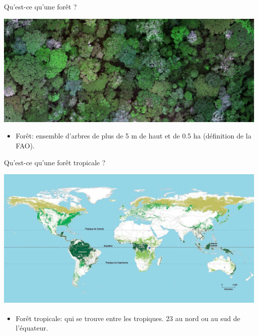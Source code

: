 \documentclass[10pt,table,dvipsnames,compress]{beamer}
\begin{document}
\begin{frame}[label={sec:org6c367b3}]{Qu'est-ce qu'une forêt ?}
\begin{center}
\includegraphics[width=\textwidth]{figs/vue-drone-foret-tropicale-2.jpg}
\end{center}

\begin{itemize}
\item Forêt: ensemble d'arbres de plus de 5 m de haut et de 0.5 ha (définition de la FAO).
\end{itemize}
\end{frame}
\begin{frame}[label={sec:org91eda36}]{Qu'est-ce qu'une forêt tropicale ?}
\begin{center}
\includegraphics[width=\textwidth]{figs/carte-des-forets-tropicales.jpg}
\end{center}

\begin{itemize}
\item Forêt tropicale: qui se trouve entre les tropiques. \textpm{}23\textsuperscript{\textdegree{}} au nord ou au sud de l'équateur.
\end{itemize}
\end{frame}
\end{document}
